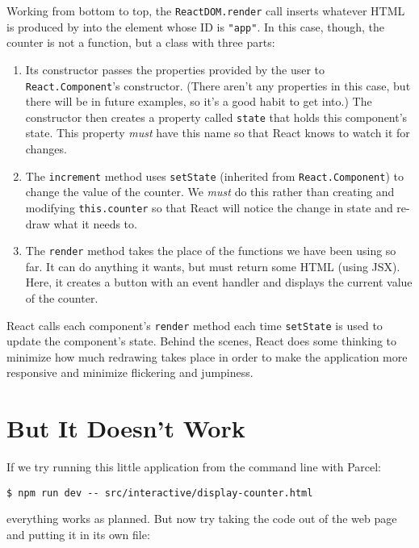 Working from bottom to top,
the \texttt{ReactDOM.render} call inserts whatever HTML is produced by \texttt{}
into the element whose ID is \texttt{"app"}.
In this case,
though,
the counter is not a function,
but a class with three parts:

\begin{enumerate}
\item
  Its constructor passes the properties provided by the user to \texttt{React.Component}'s constructor.
  (There aren't any properties in this case,
  but there will be in future examples,
  so it's a good habit to get into.)
  The constructor then creates a property called \texttt{state}
  that holds this component's state.
  This property \emph{must} have this name so that React knows to watch it for changes.
\item
  The \texttt{increment} method uses \texttt{setState} (inherited from \texttt{React.Component})
  to change the value of the counter.
  We \emph{must} do this rather than creating and modifying \texttt{this.counter}
  so that React will notice the change in state
  and re-draw what it needs to.
\item
  The \texttt{render} method takes the place of the functions we have been using so far.
  It can do anything it wants, but must return some HTML (using JSX).
  Here, it creates a button with an event handler and displays the current value of the counter.
\end{enumerate}

React calls each component's \texttt{render} method each time \texttt{setState} is used to update the component's state.
Behind the scenes,
React does some thinking to minimize how much redrawing takes place
in order to make the application more responsive and minimize flickering and jumpiness.

\section{But It Doesn't Work}\label{s:interactive-babel}

If we try running this little application from the command line with Parcel:

\begin{verbatim}
$ npm run dev -- src/interactive/display-counter.html
\end{verbatim}

\noindent
everything works as planned.
But now try taking the code out of the web page and putting it in its own file:

